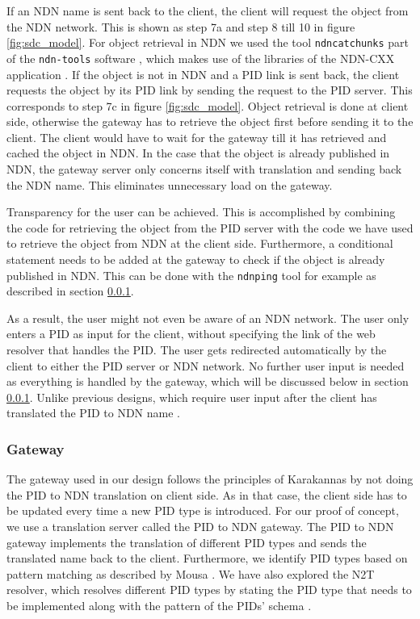 If an NDN name is sent back to the client, the client will request the object from the NDN network. This is shown as step 7a and step 8 till 10 in figure \ref{fig:sdc_model}. For object retrieval in NDN we used the tool \texttt{ndncatchunks} part of the \texttt{ndn-tools} software \cite{ndn-tools}, which makes use of the libraries of the NDN-CXX application \cite{ndn-tools}. 
If the object is not in NDN and a PID link is sent back, the client requests the object by its PID link by sending the request to the PID server. This corresponds to step 7c in figure \ref{fig:sdc_model}. Object retrieval is done at client side, otherwise the gateway has to retrieve the object first before sending it to the client. 
The client would have to wait for the gateway till it has retrieved and cached the object in NDN. 
In the case that the object is already published in NDN, the gateway server only concerns itself with translation and sending back the NDN name. This eliminates unnecessary load on the gateway.

Transparency for the user can be achieved. This is accomplished by combining the code for retrieving the object from the PID server with the code we have used to retrieve the object from NDN at the client side. Furthermore, a conditional statement needs to be added at the gateway to check if the object is already published in NDN. This can be done with the \texttt{ndnping} tool \cite{ndn-tools} for example as described in section \ref{gw}. 

As a result, the user might not even be aware of an NDN network. The user only enters a PID as input for the client, without specifying the link of the web resolver that handles the PID. The user gets redirected automatically by the client to either the PID server or NDN network. No further user input is needed as everything is handled by the gateway, which will be discussed below in section \ref{gw}.
Unlike previous designs, which require user input after the client has translated the PID to NDN name \cite{ndn-app-aware}. 

\subsubsection{Gateway}\label{gw}
The gateway used in our design follows the principles of Karakannas by not doing the PID to NDN translation on client side. As in that case, the client side has to be updated every time a new PID type is introduced. For our proof of concept, we use a translation server called the PID to NDN gateway. The PID to NDN gateway implements the translation of different PID types and sends the translated name back to the client. Furthermore, we identify PID types based on pattern matching as described by Mousa \cite{ndn-app-aware}. We have also explored the N2T resolver, which resolves different PID types by stating the PID type that needs to be implemented along with the pattern of the PIDs' schema \cite{n2t}.

